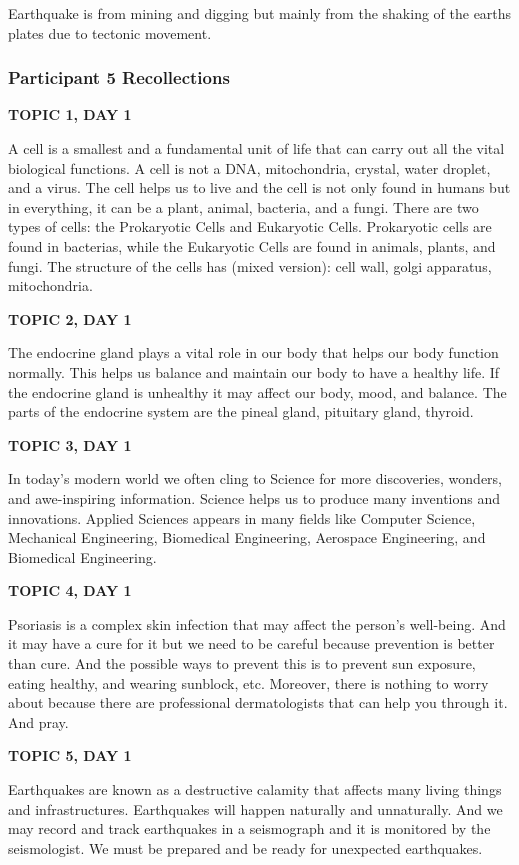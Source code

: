 {{{{Earthquake is from mining and digging but mainly from the shaking of the earths plates due to tectonic movement. 

\subsubsection{Participant 5 Recollections}

{\footnotesize
\textbf{TOPIC 1, DAY 1}


A cell is a smallest and a fundamental unit of life that can carry out all the vital 
biological functions. A cell is not a DNA, mitochondria, crystal, water droplet, and a virus.
The cell helps us to live and the cell is not only found in humans but in everything, it can be a plant, animal, bacteria, and a fungi. There are two types of cells: the Prokaryotic Cells and Eukaryotic Cells. Prokaryotic cells are found in bacterias, while the Eukaryotic Cells are found in animals, plants, and fungi. The structure of the cells has (mixed version): cell wall, golgi apparatus, mitochondria.

\textbf{TOPIC 2, DAY 1}


The endocrine gland plays a vital role in our body that helps our body function normally.
This helps us balance and maintain our body to have a healthy life. If the endocrine gland is unhealthy it may affect our body, mood, and balance. The parts of the endocrine system are the pineal gland, pituitary gland, thyroid.

\textbf{TOPIC 3, DAY 1}


In today's modern world we often cling to Science for more discoveries, wonders, and awe-inspiring information. Science helps us to produce many inventions and innovations. Applied Sciences appears in many fields like Computer Science, Mechanical Engineering, Biomedical Engineering, Aerospace Engineering, and Biomedical Engineering.

\textbf{TOPIC 4, DAY 1}


Psoriasis is a complex skin infection that may affect the person's well-being. And it may have a cure for it but we need to be careful because prevention is better than cure. And the possible ways to prevent this is to prevent sun exposure, eating healthy, and wearing sunblock, etc. Moreover, there is nothing to worry about because there are professional dermatologists that can help you through it. And pray. 

\textbf{TOPIC 5, DAY 1}


Earthquakes are known as a destructive calamity that affects many living things and infrastructures. Earthquakes will happen naturally and unnaturally. And we may record and track earthquakes in a seismograph and it is monitored by the seismologist. We must be prepared and be ready for unexpected earthquakes. 

}}}}}
